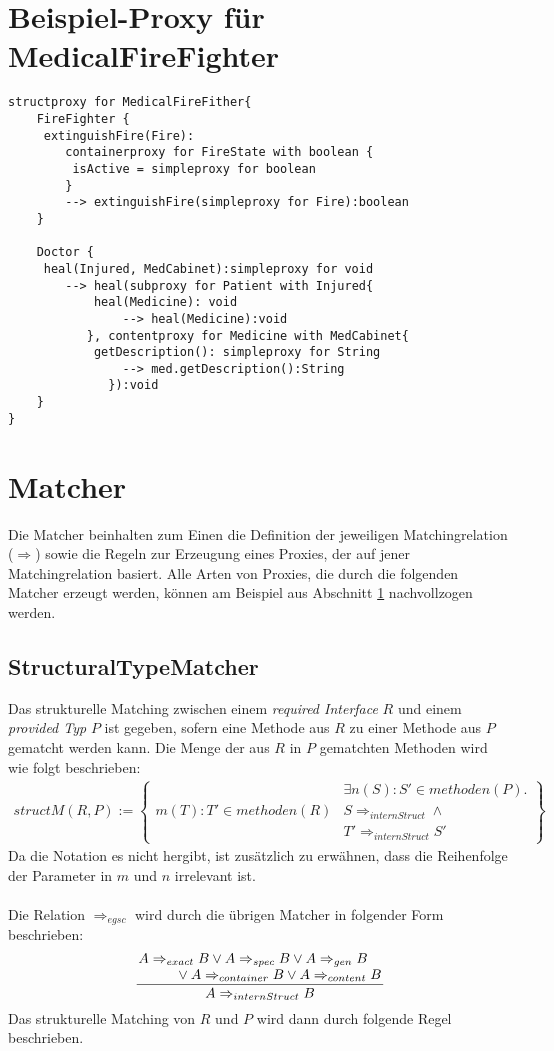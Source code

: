 \documentclass[a4paper,12pt]{article}
\begin{document}
\section{Beispiel-Proxy für MedicalFireFighter}\label{xmpl_prxy}
\begin{lstlisting}[caption={Proxy für MedicalFireFighter},captionpos=b,style = dsl]
structproxy for MedicalFireFither{
	FireFighter {
	 extinguishFire(Fire): 
	 	containerproxy for FireState with boolean {
		 isActive = simpleproxy for boolean		
		} 
		--> extinguishFire(simpleproxy for Fire):boolean
	}
		
	Doctor {
	 heal(Injured, MedCabinet):simpleproxy for void
		--> heal(subproxy for Patient with Injured{
			heal(Medicine):	void
				--> heal(Medicine):void					
		   }, contentproxy for Medicine with MedCabinet{
			getDescription(): simpleproxy for String
				--> med.getDescription():String			
		      }):void		
	}
}
\end{lstlisting}

\newpage
\section{Matcher}
Die Matcher beinhalten zum Einen die Definition der jeweiligen Matchingrelation ($\Rightarrow$) sowie die Regeln zur Erzeugung eines Proxies, der auf jener Matchingrelation basiert. Alle Arten von Proxies, die durch die folgenden Matcher erzeugt werden, können am Beispiel aus Abschnitt \ref{xmpl_prxy} nachvollzogen werden.
\subsection{StructuralTypeMatcher}
Das strukturelle Matching zwischen einem \emph{required Interface} $R$ und einem \emph{provided Typ} $P$ ist gegeben, sofern eine Methode aus $R$ zu einer Methode aus $P$ gematcht werden kann. Die Menge der aus $R$ in $P$ gematchten Methoden wird wie folgt beschrieben:
\begin{gather*}
structM(R,P) := \left\{ 
				\begin{array}{l|l}
						& \exists n(S):S' \in methoden(P) .\\													m(T):T' \in methoden(R) &  S\Rightarrow_{internStruct} \wedge \\
										& T' \Rightarrow_{internStruct}S'
				\end{array}
              \right\}
\end{gather*}
Da die Notation es nicht hergibt, ist zusätzlich zu erwähnen, dass die Reihenfolge der Parameter in $m$ und $n$ irrelevant ist.\\\\
Die Relation $\Rightarrow_{egsc}$ wird durch die übrigen Matcher in folgender Form beschrieben:
\begin{gather*}
\frac{\splitfrac{A \Rightarrow_{exact}B \vee A \Rightarrow_{spec}B 
\vee A \Rightarrow_{gen}B}{\vee A \Rightarrow_{container} B \vee A \Rightarrow_{content} B}}{A \Rightarrow_{internStruct}B}
\end{gather*}
Das strukturelle Matching von $R$ und $P$ wird dann durch folgende Regel beschrieben.
\end{document}
